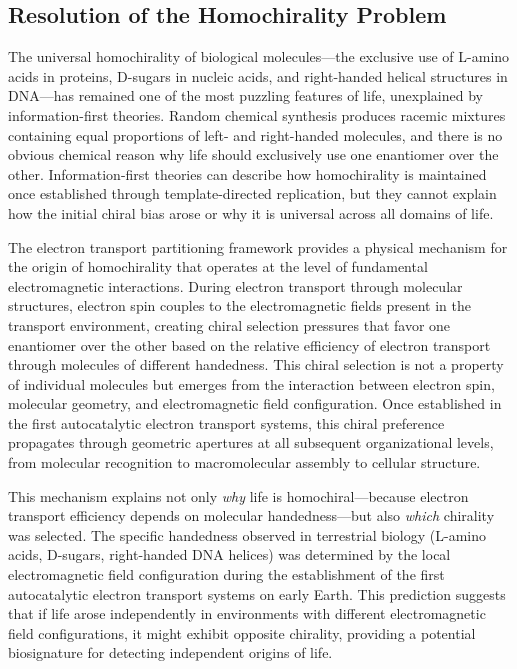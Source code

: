 \documentclass[12pt,a4paper]{article}
\begin{document}
\subsection{Resolution of the Homochirality Problem}

The universal homochirality of biological molecules—the exclusive use of L-amino acids in proteins, D-sugars in nucleic acids, and right-handed helical structures in DNA—has remained one of the most puzzling features of life, unexplained by information-first theories. Random chemical synthesis produces racemic mixtures containing equal proportions of left- and right-handed molecules, and there is no obvious chemical reason why life should exclusively use one enantiomer over the other. Information-first theories can describe how homochirality is maintained once established through template-directed replication, but they cannot explain how the initial chiral bias arose or why it is universal across all domains of life.

The electron transport partitioning framework provides a physical mechanism for the origin of homochirality that operates at the level of fundamental electromagnetic interactions. During electron transport through molecular structures, electron spin couples to the electromagnetic fields present in the transport environment, creating chiral selection pressures that favor one enantiomer over the other based on the relative efficiency of electron transport through molecules of different handedness. This chiral selection is not a property of individual molecules but emerges from the interaction between electron spin, molecular geometry, and electromagnetic field configuration. Once established in the first autocatalytic electron transport systems, this chiral preference propagates through geometric apertures at all subsequent organizational levels, from molecular recognition to macromolecular assembly to cellular structure.

This mechanism explains not only \emph{why} life is homochiral—because electron transport efficiency depends on molecular handedness—but also \emph{which} chirality was selected. The specific handedness observed in terrestrial biology (L-amino acids, D-sugars, right-handed DNA helices) was determined by the local electromagnetic field configuration during the establishment of the first autocatalytic electron transport systems on early Earth. This prediction suggests that if life arose independently in environments with different electromagnetic field configurations, it might exhibit opposite chirality, providing a potential biosignature for detecting independent origins of life.
\end{document}
